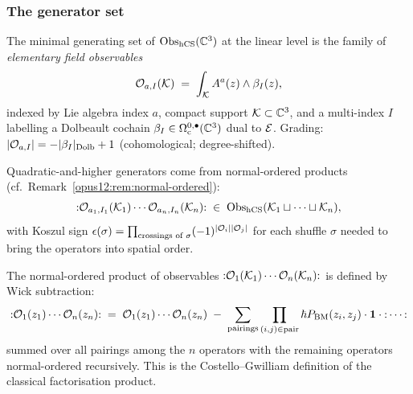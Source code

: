 \begin{center}
\end{center}

\subsubsection{The generator set}

\begin{definition}\ClaimStatusDefinition
\label{opus12:def:generators}
The minimal generating set of $\mathrm{Obs}_{\mathrm{hCS}}(\mathbb{C}^3)$ at the linear level
is the family of \emph{elementary field observables}
\[
\mathcal{O}_{a, I}(\mathcal K) \;=\; \int_\mathcal K A^a(z) \wedge \beta_I(z),
\]
indexed by Lie algebra index $a$, compact support $\mathcal K \subset
\mathbb{C}^3$, and a multi-index $I$ labelling a Dolbeault cochain
$\beta_I \in \Omega^{0,\bullet}_{\mathrm{c}}(\mathbb{C}^3)$ dual to $\mathcal{E}$.
Grading: $|\mathcal{O}_{a, I}| = -|\beta_I|_{\mathrm{Dolb}} + 1$ (cohomological;
degree-shifted).

Quadratic-and-higher generators come from normal-ordered products
(cf.~Remark~\ref{opus12:rem:normal-ordered}):
\[
{:} \mathcal{O}_{a_1, I_1}(\mathcal K_1) \cdots \mathcal{O}_{a_n, I_n}(\mathcal K_n) {:}
\;\in\; \mathrm{Obs}_{\mathrm{hCS}}(\mathcal K_1 \sqcup \cdots \sqcup \mathcal K_n),
\]
with Koszul sign
$\epsilon(\sigma) = \prod_{\text{crossings of }\sigma} (-1)^{|\mathcal{O}_i||\mathcal{O}_j|}$
for each shuffle $\sigma$ needed to bring the operators into
spatial order.
\end{definition}

\begin{remark}\ClaimStatusRemark
\label{opus12:rem:normal-ordered}
The normal-ordered product of observables
${:} \mathcal{O}_1(\mathcal K_1) \cdots \mathcal{O}_n(\mathcal K_n) {:}$ is defined
by Wick subtraction:
\[
{:}\mathcal{O}_1(z_1) \cdots \mathcal{O}_n(z_n){:} \;=\;
\mathcal{O}_1(z_1) \cdots \mathcal{O}_n(z_n) \;-\;
\sum_{\text{pairings}} \prod_{(i,j) \in \text{pair}}
\hbar P_{\mathrm{BM}}(z_i, z_j) \cdot \mathbf{1} \cdot {:}\cdots{:}
\]
summed over all pairings among the $n$ operators with the remaining
operators normal-ordered recursively. This is the Costello--Gwilliam
definition of the classical factorisation product.
\end{remark}

